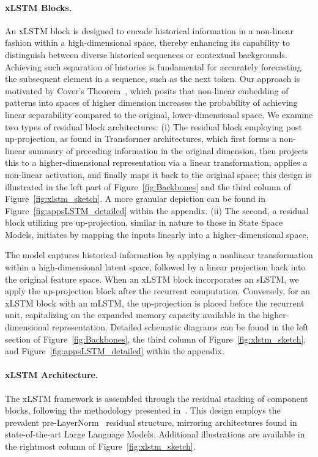 \paragraph{xLSTM Blocks.}
\label{sec:xLSTMblock}
An xLSTM block is designed to encode historical information in a non-linear fashion within a high-dimensional space, thereby enhancing its capability to distinguish between diverse historical sequences or contextual backgrounds. Achieving such separation of histories is fundamental for accurately forecasting the subsequent element in a sequence, such as the next token. Our approach is motivated by Cover’s Theorem~\citep{Cover:65}, which posits that non-linear embedding of patterns into spaces of higher dimension increases the probability of achieving linear separability compared to the original, lower-dimensional space. We examine two types of residual block architectures: (i) The residual block employing post up-projection, as found in Transformer architectures, which first forms a non-linear summary of preceding information in the original dimension, then projects this to a higher-dimensional representation via a linear transformation, applies a non-linear activation, and finally maps it back to the original space; this design is illustrated in the left part of Figure~\ref{fig:Backbones} and the third column of Figure~\ref{fig:xlstm_sketch}. A more granular depiction can be found in Figure~\ref{fig:appsLSTM_detailed} within the appendix. (ii) The second, a residual block utilizing pre up-projection, similar in nature to those in State Space Models, initiates by mapping the inputs linearly into a higher-dimensional space,

The model captures historical information by applying a nonlinear transformation within a high-dimensional latent space, followed by a linear projection back into the original feature space. When an xLSTM block incorporates an sLSTM, we apply the up-projection block after the recurrent computation. Conversely, for an xLSTM block with an mLSTM, the up-projection is placed before the recurrent unit, capitalizing on the expanded memory capacity available in the higher-dimensional representation. Detailed schematic diagrams can be found in the left section of Figure~\ref{fig:Backbones}, the third column of Figure~\ref{fig:xlstm_sketch}, and Figure~\ref{fig:appsLSTM_detailed} within the appendix.

\paragraph{xLSTM Architecture.}
\label{sec:xLSTMarchitecure}
The xLSTM framework is assembled through the residual stacking of component blocks, following the methodology presented in~\citep{Srivastava:15,He:16}. This design employs the prevalent pre-LayerNorm~\citep{Ba:16b} residual structure, mirroring architectures found in state-of-the-art Large Language Models. Additional illustrations are available in the rightmost column of Figure~\ref{fig:xlstm_sketch}.

